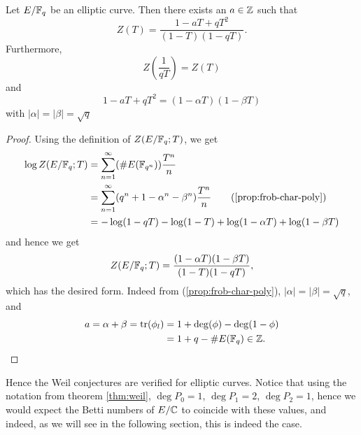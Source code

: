 \begin{theorem}
	Let $E/\mathbb{F}_q$ be an elliptic curve. Then there exists an $a \in \mathbb{Z}$ such that
	\begin{equation*}
		Z(T) = \frac{1 - aT + qT^2}{(1-T)(1-qT)}.
	\end{equation*}
	Furthermore,
	\begin{equation*}
		Z\left(\frac{1}{qT}\right) = Z(T)
	\end{equation*}
	and
	\begin{equation*}
		1 - aT + qT^2 = (1 - \alpha T)(1 - \beta T)
	\end{equation*}
	with $|\alpha| = |\beta| = \sqrt{q}$
\end{theorem}

\begin{proof}
	Using the definition of $Z(E/\mathbb{F}_q; T)$, we get
	\begin{align*}
		\log Z(E/\mathbb{F}_q; T) &= \sum_{n=1}^\infty (\#E(\mathbb{F}_{q^n}))\frac{T^n}{n}\\
		&= \sum_{n=1}^\infty (q^n + 1 - \alpha^n - \beta^n)\frac{T^n}{n}
		\qquad \textrm{(\ref{prop:frob-char-poly})}\\
		&= -\log(1 - qT) - \log(1 - T) + \log(1 - \alpha T) + \log(1 - \beta T)
	\end{align*}
	and hence we get
	\begin{equation*}
		Z(E/\mathbb{F}_q; T) = \frac{(1 - \alpha T)(1 - \beta T)}{(1 - T)(1 - qT)},
	\end{equation*}
	which has the desired form.
	Indeed from (\ref{prop:frob-char-poly}), 
	$|\alpha| = |\beta| = \sqrt{q}$, and
	\begin{align*}
		a = \alpha + \beta = \operatorname{tr}(\phi_l) &= 1 + \deg(\phi) - \deg(1 - \phi)\\
		&= 1 + q - \#E(\mathbb{F}_q) \in \mathbb{Z}.
	\end{align*}

\end{proof}

Hence the Weil conjectures are verified for elliptic curves. Notice that
using the notation from theorem \ref{thm:weil},
$\deg P_0 = 1$, $\deg P_1 = 2$, $\deg P_2 = 1$, hence we would expect
the Betti numbers of $E/\mathbb{C}$ to coincide with these values, and indeed, as we
will see in the following section, this is indeed the case.
